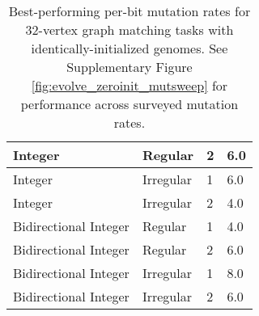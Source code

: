 \begin{table}[!htbp]
\begin{tabular}{l|l|l|l}
Integer               & Regular                   & 2                      & 6.0                                            \\ \hline
Integer               & Irregular                 & 1                      & 6.0                                            \\ \hline
Integer               & Irregular                 & 2                      & 4.0                                            \\ \hline
Bidirectional Integer & Regular                   & 1                      & 4.0                                            \\ \hline
Bidirectional Integer & Regular                   & 2                      & 6.0                                            \\ \hline
Bidirectional Integer & Irregular                 & 1                      & 8.0                                            \\ \hline
Bidirectional Integer & Irregular                 & 2                      & 6.0
\end{tabular}

\caption{
Best-performing per-bit mutation rates for 32-vertex graph matching tasks with identically-initialized genomes.
See Supplementary Figure \ref{fig:evolve_zeroinit_mutsweep} for performance across surveyed mutation rates.
}
\label{tab:evo_graph_mut_zeroinit}

\end{table}

